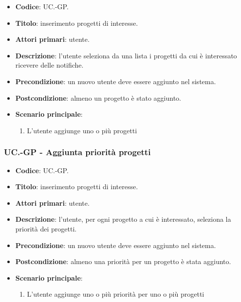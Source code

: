     \begin{itemize}
        \item \textbf{Codice}: UC\theuccount.\thesubuccount-GP.
        \item \textbf{Titolo}: inserimento progetti di interesse.
        \item \textbf{Attori primari}: utente.
        \item \textbf{Descrizione}: l'utente seleziona da una lista i progetti da cui è interessato ricevere delle notifiche.
        \item \textbf{Precondizione}: un nuovo utente deve essere aggiunto nel sistema.
        \item \textbf{Postcondizione}: almeno un progetto è stato aggiunto.
        \item \textbf{Scenario principale}:
        \begin{enumerate}
            \item L'utente aggiunge uno o più progetti
        \end{enumerate}
    \end{itemize}
    
    \subsubsection{UC\theuccount.\thesubuccount-GP - Aggiunta priorità progetti}
    
    \begin{itemize}
        \item \textbf{Codice}: UC\theuccount.\thesubuccount-GP.
        \item \textbf{Titolo}: inserimento progetti di interesse.
        \item \textbf{Attori primari}: utente.
        \item \textbf{Descrizione}: l'utente, per ogni progetto a cui è interessato, seleziona la priorità dei progetti.
        \item \textbf{Precondizione}: un nuovo utente deve essere aggiunto nel sistema.
        \item \textbf{Postcondizione}: almeno una priorità per un progetto è stata aggiunto.
        \item \textbf{Scenario principale}:
        \begin{enumerate}
            \item L'utente aggiunge uno o più priorità per uno o più progetti
        \end{enumerate}
    \end{itemize}